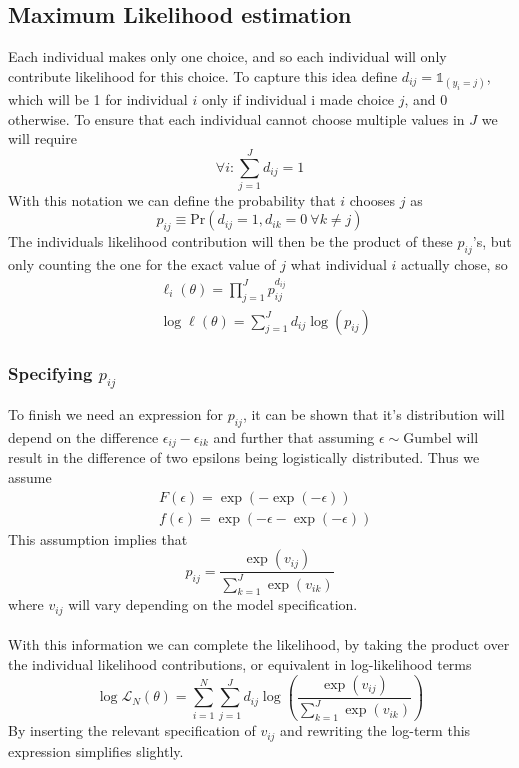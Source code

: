 \subsection{Maximum Likelihood estimation}
Each individual makes only one choice, and so each individual will only contribute likelihood for this choice. To capture this idea define $d_{ij}=\mathds{1}_{(y_i = j)}$, which will be 1 for individual $i$ only if individual i made choice $j$, and 0 otherwise. To ensure that each individual cannot choose multiple values in $J$ we will require
\begin{equation}
\forall i: \sum_{j=1}^J d_{ij} = 1
\end{equation}
With this notation we can define the probability that $i$ chooses $j$ as
\begin{equation}
p_{ij}\equiv \textrm{Pr}(d_{ij}=1, d_{ik} = 0 \ \forall k\neq j)
\end{equation}
The individuals likelihood contribution will then be the product of these $p_{ij}$'s, but only counting the one for the exact value of $j$ what individual $i$ actually chose, so
\begin{equation}
\begin{split}
&\ell_i(\theta) = \prod_{j=1}^J p_{ij}^{d_{ij}} \\
& \log \ell(\theta) = \sum_{j=1}^J d_{ij} \log(p_{ij})
\end{split}
\end{equation}


\subsubsection{Specifying $p_{ij}$}
To finish we need an expression for $p_{ij}$, it can be shown that it's distribution will depend on the difference $\epsilon_{ij}-\epsilon_{ik}$ and further that assuming $\epsilon \sim \textrm{Gumbel}$ will result in the difference of two epsilons being logistically distributed. Thus we assume
\begin{equation}
\begin{split}
&F(\epsilon) = \exp(-\exp(-\epsilon)) \\
& f(\epsilon) = \exp(-\epsilon -\exp(-\epsilon))
\end{split}
\end{equation}
This assumption implies that
\begin{equation}
p_{ij} = \frac{\exp(v_{ij})}{ \sum_{k=1}^J \exp(v_{ik})}
\end{equation}
where $v_{ij}$ will vary depending on the model specification.
\\ \\
With this information we can complete the likelihood, by taking the product over the individual likelihood contributions, or equivalent in log-likelihood terms
\begin{equation*}
\log \mathcal{L}_N(\theta) = \sum_{i=1}^N \sum_{j=1}^J d_{ij} \log \left( \frac{\exp(v_{ij})}{ \sum_{k=1}^J \exp(v_{ik})}
\right)
\end{equation*}
By inserting the relevant specification of $v_{ij}$ and rewriting the log-term this expression simplifies slightly.

